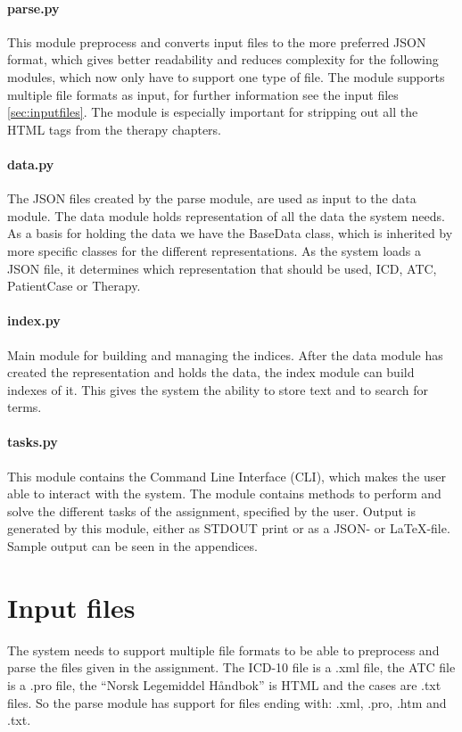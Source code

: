 \paragraph{parse.py}
This module preprocess and converts input files to the more preferred JSON format, which gives better readability and reduces complexity for the following modules, which now only have to support one type of file. The module supports multiple file formats as input, for further information see the input files \autoref{sec:inputfiles}. The module is especially important for stripping out all the HTML tags from the therapy chapters. 

\paragraph{data.py}
The JSON files created by the parse module, are used as input to the data module. The data module holds representation of all the data the system needs. As a basis for holding the data we have the BaseData class, which is inherited by more specific classes for the different representations. As the system loads a JSON file, it determines which representation that should be used, ICD, ATC, PatientCase or Therapy. 

\paragraph{index.py}
Main module for building and managing the indices. After the data module has created the representation and holds the data, the index module can build indexes of it. This gives the system the ability to store text and to search for terms.

\paragraph{tasks.py}
This module contains the Command Line Interface (CLI), which makes the user able to interact with the system. The module contains methods to perform and solve the different tasks of the assignment, specified by the user. Output is generated by this module, either as STDOUT print or as a JSON- or LaTeX-file. Sample output can be seen in the appendices. 


\section{Input files}
\label{sec:inputfiles}
The system needs to support multiple file formats to be able to preprocess and parse the files given in the assignment. The ICD-10 file is a .xml file, the ATC file is a .pro file, the ``Norsk Legemiddel Håndbok'' is HTML and the cases are .txt files. So the parse module has support for files ending with: .xml, .pro, .htm and .txt. 


